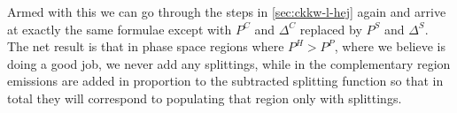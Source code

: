 Armed with this we can go through the steps in \cref{sec:ckkw-l-hej}
again and arrive at exactly the same formulae except with $P^C$ and
$\Delta^C$ replaced by $P^S$ and $\Delta^S$. The net result is that in
phase space regions where $P^H>P^P$, where we believe \HEJ is doing a
good job, we never add any \pyt splittings, while in the complementary
region emissions are added in proportion to the subtracted splitting
function so that in total they will correspond to populating that
region only with \pyt splittings.





